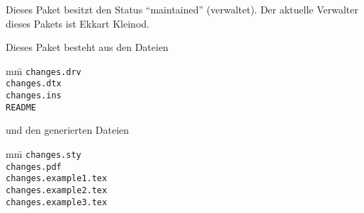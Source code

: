 	 Dieses Paket besitzt den Status "`maintained"' (verwaltet).
	 Der aktuelle Verwalter dieses Pakets ist Ekkart Kleinod.

	 Dieses Paket besteht aus den Dateien
	 \begin{tabbing}
		mm\=\kill
		\>\texttt{changes.drv}\\
		\>\texttt{changes.dtx}\\
		\>\texttt{changes.ins}\\
		\>\texttt{README}
	 \end{tabbing}
	 und den generierten Dateien
	 \begin{tabbing}
		mm\=\kill
		\>\texttt{changes.sty}\\
		\>\texttt{changes.pdf}\\
		\>\texttt{changes.example1.tex}\\
		\>\texttt{changes.example2.tex}\\
		\>\texttt{changes.example3.tex}
	 \end{tabbing}
	\fi

